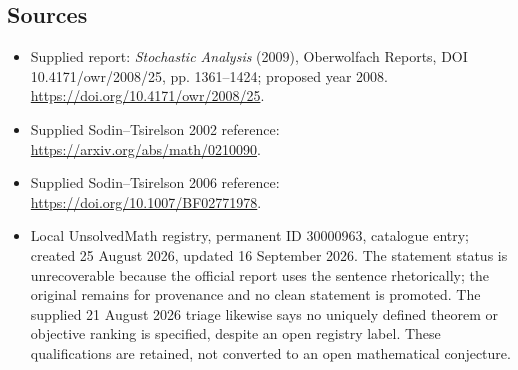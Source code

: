 \documentclass[11pt]{article}
\begin{document}
\subsection{Sources}
\begin{itemize}
\item Supplied report: \emph{Stochastic Analysis} (2009), Oberwolfach Reports, DOI 10.4171/owr/2008/25, pp. 1361--1424; proposed year 2008. \url{https://doi.org/10.4171/owr/2008/25}.
\item Supplied Sodin--Tsirelson 2002 reference: \url{https://arxiv.org/abs/math/0210090}.
\item Supplied Sodin--Tsirelson 2006 reference: \url{https://doi.org/10.1007/BF02771978}.
\item Local UnsolvedMath registry, permanent ID 30000963, catalogue entry; created 25 August 2026, updated 16 September 2026. The statement status is unrecoverable because the official report uses the sentence rhetorically; the original remains for provenance and no clean statement is promoted. The supplied 21 August 2026 triage likewise says no uniquely defined theorem or objective ranking is specified, despite an open registry label. These qualifications are retained, not converted to an open mathematical conjecture.
\end{itemize}
\end{document}
